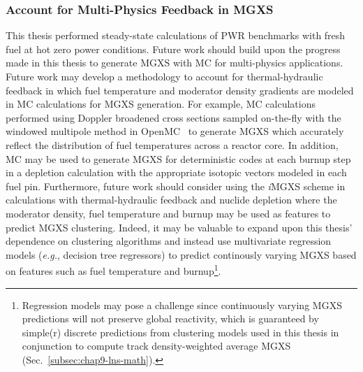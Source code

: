 


\subsubsection{Account for Multi-Physics Feedback in MGXS}
\label{subsubsec:chap12-multi-physics-mgxs}

This thesis performed steady-state calculations of \ac{PWR} benchmarks with fresh fuel at hot zero power conditions. Future work should build upon the progress made in this thesis to generate \ac{MGXS} with \ac{MC} for multi-physics applications. Future work may develop a methodology to account for thermal-hydraulic feedback in which fuel temperature and moderator density gradients are modeled in \ac{MC} calculations for \ac{MGXS} generation. For example, \ac{MC} calculations performed using Doppler broadened cross sections sampled on-the-fly with the windowed multipole method in OpenMC~\cite{forget2014direct} to generate \ac{MGXS} which accurately reflect the distribution of fuel temperatures across a reactor core. In addition, \ac{MC} may be used to generate \ac{MGXS} for deterministic codes at each burnup step in a depletion calculation with the appropriate isotopic vectors modeled in each fuel pin. Furthermore, future work should consider using the \textit{i}\ac{MGXS} scheme in calculations with thermal-hydraulic feedback and nuclide depletion where the moderator density, fuel temperature and burnup may be used as features to predict MGXS clustering. Indeed, it may be valuable to expand upon this thesis' dependence on clustering algorithms and instead use multivariate regression models (\textit{e.g.}, decision tree regressors) to predict continously varying \ac{MGXS} based on features such as fuel temperature and burnup\footnote{Regression models may pose a challenge since continuously varying \ac{MGXS} predictions will not preserve global reactivity, which is guaranteed by simple(r) discrete predictions from clustering models used in this thesis in conjunction to compute track density-weighted average \ac{MGXS} (Sec.~\ref{subsec:chap9-lns-math}).}.

